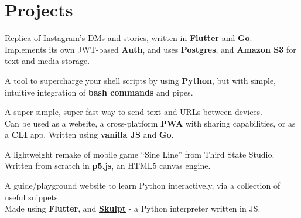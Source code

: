 \documentclass[]{resume}
\begin{document}
\begin{minipage}[t]{0.62\textwidth}

\section{Projects}

Replica of Instagram's DMs and stories, written in \textbf{Flutter} and \textbf{Go}.\\
Implements its own JWT-based \textbf{Auth}, and uses \textbf{Postgres}, and \textbf{Amazon S3} for text and media storage.
\sectionsep

A tool to supercharge your shell scripts by using \textbf{Python}, but with simple, intuitive integration of \textbf{bash commands} and pipes.
\sectionsep

A super simple, super fast way to send text and URLs between devices.\\
Can be used as a website, a cross-platform \textbf{PWA} with sharing capabilities, or as a \textbf{CLI} app. Written using \textbf{vanilla JS} and \textbf{Go}.
\sectionsep

A lightweight remake of mobile game “Sine Line” from Third State Studio.\\
Written from scratch in \textbf{p5.js}, an HTML5 canvas engine.
\sectionsep

A guide/playground website to learn Python interactively, via a collection of useful snippets.\\
Made using \textbf{Flutter}, and \href{https://skulpt.org}{\textbf{Skulpt}} - a Python interpreter written in JS.
\sectionsep




\end{minipage}
\end{document}
